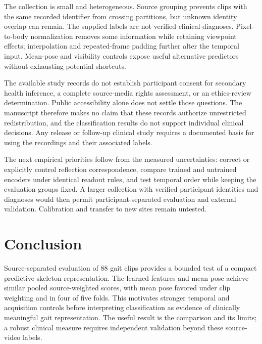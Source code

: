\documentclass[10pt,twocolumn,letterpaper]{article}
\begin{document}
The collection is small and heterogeneous. Source grouping prevents clips with the same recorded identifier from crossing partitions, but unknown identity overlap can remain. The supplied labels are not verified clinical diagnoses. Pixel-to-body normalization removes some information while retaining viewpoint effects; interpolation and repeated-frame padding further alter the temporal input. Mean-pose and visibility controls expose useful alternative predictors without exhausting potential shortcuts.

The available study records do not establish participant consent for secondary health inference, a complete source-media rights assessment, or an ethics-review determination. Public accessibility alone does not settle those questions. The manuscript therefore makes no claim that these records authorize unrestricted redistribution, and the classification results do not support individual clinical decisions. Any release or follow-up clinical study requires a documented basis for using the recordings and their associated labels.

The next empirical priorities follow from the measured uncertainties: correct or explicitly control reflection correspondence, compare trained and untrained encoders under identical readout rules, and test temporal order while keeping the evaluation groups fixed. A larger collection with verified participant identities and diagnoses would then permit participant-separated evaluation and external validation. Calibration and transfer to new sites remain untested.

\section{Conclusion}
Source-separated evaluation of 88 gait clips provides a bounded test of a compact predictive skeleton representation. The learned features and mean pose achieve similar pooled source-weighted scores, with mean pose favored under clip weighting and in four of five folds. This motivates stronger temporal and acquisition controls before interpreting classification as evidence of clinically meaningful gait representation. The useful result is the comparison and its limits; a robust clinical measure requires independent validation beyond these source-video labels.

{\small


}
\end{document}
